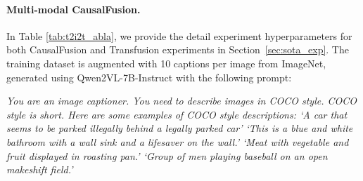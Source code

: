 \vspace{-15pt}
\paragraph{Multi-modal CausalFusion.} 
\label{appendix:t2i2t}
In Table \ref{tab:t2i2t_abla}, we provide the detail experiment hyperparameters for both CausalFusion and Transfusion experiments in Section~\ref{sec:sota_exp}.
The training dataset is augmented with 10 captions per image from ImageNet, generated using Qwen2VL-7B-Instruct \cite{qwen2vl} with the following prompt:

\textit{
You are an image captioner. You need to describe images in COCO style. COCO style is short. Here are some examples of COCO style descriptions: 
`A car that seems to be parked illegally behind a legally parked car'
`This is a blue and white bathroom with a wall sink and a lifesaver on the wall.'
`Meat with vegetable and fruit displayed in roasting pan.'
`Group of men playing baseball on an open makeshift field.'
}
\vspace{-5pt}


